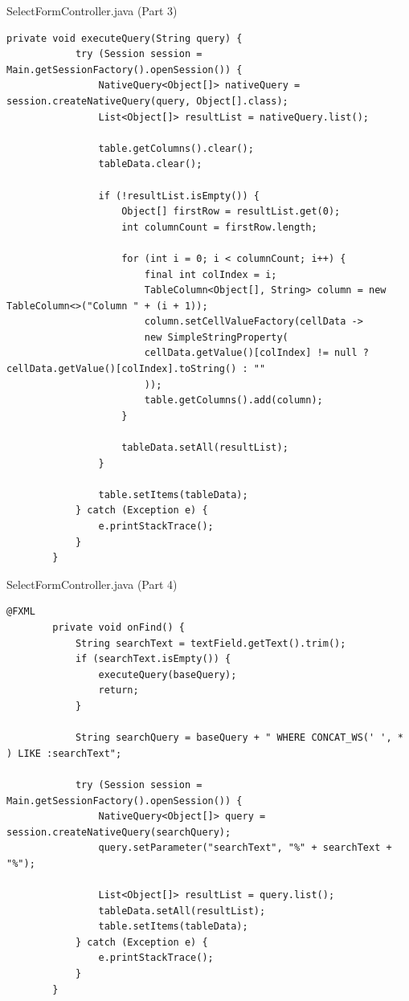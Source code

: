 \documentclass[aspectratio=169, table]{beamer}
\begin{document}
\begin{frame}[fragile]{SelectFormController.java (Part 3)}
	\vspace{20pt}
	\begin{lstlisting}[style=JavaStyle]
		private void executeQuery(String query) {
			try (Session session = Main.getSessionFactory().openSession()) {
				NativeQuery<Object[]> nativeQuery = session.createNativeQuery(query, Object[].class);
				List<Object[]> resultList = nativeQuery.list();
				
				table.getColumns().clear();
				tableData.clear();
				
				if (!resultList.isEmpty()) {
					Object[] firstRow = resultList.get(0);
					int columnCount = firstRow.length;
					
					for (int i = 0; i < columnCount; i++) {
						final int colIndex = i;
						TableColumn<Object[], String> column = new TableColumn<>("Column " + (i + 1));
						column.setCellValueFactory(cellData ->
						new SimpleStringProperty(
						cellData.getValue()[colIndex] != null ? cellData.getValue()[colIndex].toString() : ""
						));
						table.getColumns().add(column);
					}
					
					tableData.setAll(resultList);
				}
				
				table.setItems(tableData);
			} catch (Exception e) {
				e.printStackTrace();
			}
		}
	\end{lstlisting}
\end{frame}

\begin{frame}[fragile]{SelectFormController.java (Part 4)}
	\vspace{20pt}
	\begin{lstlisting}[style=JavaStyle]
		@FXML
		private void onFind() {
			String searchText = textField.getText().trim();
			if (searchText.isEmpty()) {
				executeQuery(baseQuery);
				return;
			}
			
			String searchQuery = baseQuery + " WHERE CONCAT_WS(' ', * ) LIKE :searchText";
			
			try (Session session = Main.getSessionFactory().openSession()) {
				NativeQuery<Object[]> query = session.createNativeQuery(searchQuery);
				query.setParameter("searchText", "%" + searchText + "%");
				
				List<Object[]> resultList = query.list();
				tableData.setAll(resultList);
				table.setItems(tableData);
			} catch (Exception e) {
				e.printStackTrace();
			}
		}
	\end{lstlisting}
\end{frame}
\end{document}
